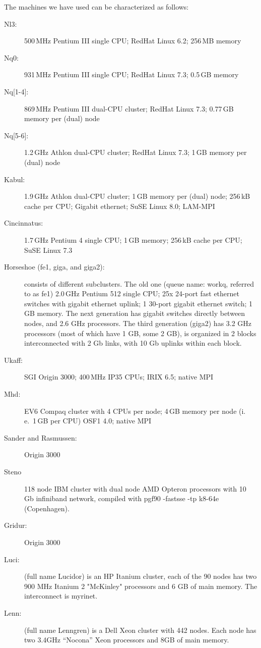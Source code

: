 \documentclass[\mydriver,12pt,twoside,notitlepage,a4paper]{article}
\begin{document}
The machines we have used can be characterized as follows:
\begin{description}
\item[Nl3:] 500\,MHz Pentium III single CPU;
  RedHat Linux 6.2;
  256\,MB memory
\item[Nq0:] 931\,MHz Pentium III single CPU;
  RedHat Linux 7.3;
  0.5\,GB memory
\item[Nq{[1-4]}:] 869\,MHz Pentium III dual-CPU cluster;
  RedHat Linux 7.3;
  0.77\,GB memory per (dual) node
\item[Nq{[5-6]}:] 1.2\,GHz Athlon dual-CPU cluster;
  RedHat Linux 7.3;
  1\,GB memory per (dual) node
\item[Kabul:] 1.9\,GHz Athlon dual-CPU cluster;
  1\,GB memory per (dual) node;
  256\,kB cache per CPU;
  Gigabit ethernet;
  SuSE Linux 8.0;
  LAM-MPI
\item[Cincinnatus:] 1.7\,GHz Pentium 4 single CPU;
  1\,GB memory;
  256\,kB cache per CPU;
  SuSE Linux 7.3
\item[Horseshoe (fe1, giga, and giga2):] consists of different subclusters.
  The old one (queue name: workq, referred to as fe1)
  2.0\,GHz Pentium 512 single CPU;
  25x 24-port fast ethernet switches with gigabit ethernet uplink;
  1 30-port gigabit ethernet switch; 1\,GB memory.
  The next generation has gigabit switches directly between nodes,
  and 2.6 GHz processors.
  The third generation (giga2) has 3.2 GHz processors (most of which have 1 GB,
  some 2 GB), is organized in 2 blocks interconnected with 2 Gb links,
  with 10 Gb uplinks within each block.
\item[Ukaff:] SGI Origin 3000;
  400\,MHz IP35 CPUs;
  IRIX 6.5;
  native MPI
\item[Mhd:] EV6 Compaq cluster with 4 CPUs per node;
  4\,GB memory per node (i.\,e.~1\,GB per CPU)
  OSF1 4.0;
  native MPI
\item[Sander and Rasmussen:] Origin 3000
\item[Steno] 118 node IBM cluster with dual node AMD Opteron processors
with 10 Gb infiniband network, compiled with pgf90 -fastsse -tp k8-64e (Copenhagen).
\item[Gridur:] Origin 3000
\item[Luci:] (full name Lucidor) is an HP Itanium cluster, each of the 90
nodes has two 900 MHz Itanium 2 "McKinley" processors and 6 GB of main memory.
The interconnect is myrinet.
\item[Lenn:] (full name Lenngren) is a Dell Xeon cluster with 442 nodes.
Each node has two 3.4GHz ``Nocona'' Xeon processors and 8GB of main memory.

\end{description}
\end{document}
